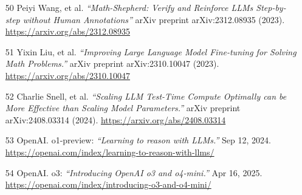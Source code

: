 \documentclass[12pt]{article}
\begin{document}
\begin{itemize}
    \item [50] Peiyi Wang, et al. \textit{``Math-Shepherd: Verify and Reinforce LLMs Step-by-step without Human Annotations''} arXiv preprint arXiv:2312.08935 (2023). \url{https://arxiv.org/abs/2312.08935}
    \item [51] Yixin Liu, et al. \textit{``Improving Large Language Model Fine-tuning for Solving Math Problems.''} arXiv preprint arXiv:2310.10047 (2023). \url{https://arxiv.org/abs/2310.10047}
    \item [52] Charlie Snell, et al. \textit{``Scaling LLM Test-Time Compute Optimally can be More Effective than Scaling Model Parameters.''} arXiv preprint arXiv:2408.03314 (2024). \url{https://arxiv.org/abs/2408.03314}
    \item [53] OpenAI. o1-preview: \textit{``Learning to reason with LLMs.''} Sep 12, 2024. \url{https://openai.com/index/learning-to-reason-with-llms/}
    \item [54] OpenAI. o3: \textit{``Introducing OpenAI o3 and o4-mini.''} Apr 16, 2025. \url{https://openai.com/index/introducing-o3-and-o4-mini/}
\end{itemize}
\end{document}
